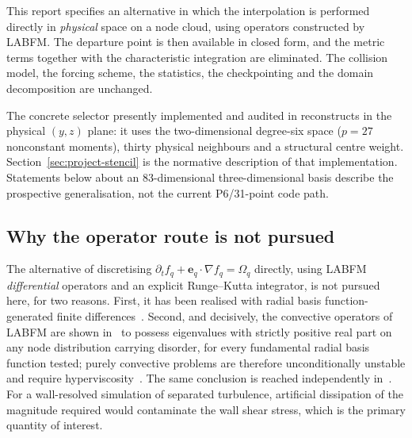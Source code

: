 \documentclass[11pt,a4paper]{article}
\begin{document}
This report specifies an alternative in which the interpolation is performed directly
in \emph{physical} space on a node cloud, using operators constructed by LABFM. The
departure point is then available in closed form, and the metric terms together with
the characteristic integration are eliminated. The collision model, the forcing scheme,
the statistics, the checkpointing and the domain decomposition are unchanged.

The concrete selector presently implemented and audited in
 reconstructs in the physical $(y,z)$ plane: it uses
the two-dimensional degree-six space ($p=27$ nonconstant moments), thirty physical
neighbours and a structural centre weight. Section~\ref{sec:project-stencil} is the
normative description of that implementation. Statements below about an 83-dimensional
three-dimensional basis describe the prospective generalisation, not the current
P6/31-point code path.

\begin{center}
\end{center}

\subsection{Why the operator route is not pursued}

The alternative of discretising $\partial_t f_q + \bm e_q\!\cdot\!\nabla f_q =
\Omega_q$ directly, using LABFM \emph{differential} operators and an explicit
Runge--Kutta integrator, is not pursued here, for two reasons. First, it has been
realised with radial basis function-generated finite differences~\cite{Maidenberg2026}.
Second, and decisively, the convective operators of LABFM are shown
in~\cite[\S 4.2]{KLN2020} to possess eigenvalues with strictly positive real part on
any node distribution carrying disorder, for every fundamental radial basis function
tested; purely convective problems are therefore unconditionally unstable and require
hyperviscosity~\cite[Eq.~(25)]{KLN2020}. The same conclusion is reached independently
in~\cite[Fig.~10]{Broadley2026}. For a wall-resolved simulation of separated
turbulence, artificial dissipation of the magnitude required would contaminate the
wall shear stress, which is the primary quantity of interest.
\end{document}

